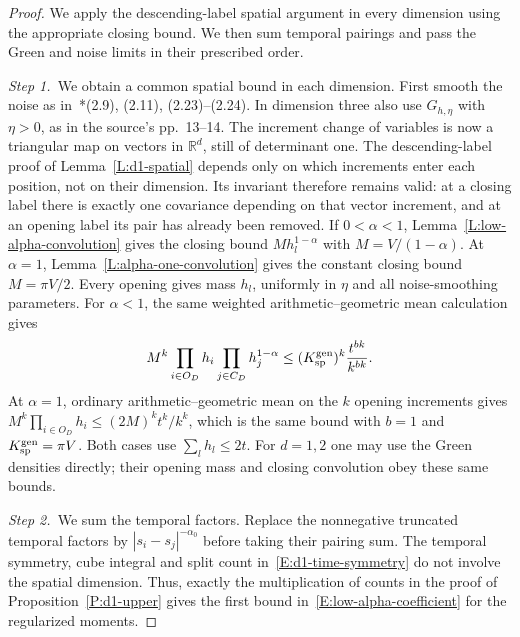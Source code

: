 \documentclass[12pt,oneside,openany]{book}
\numberwithin{equation}{section}
\theoremstyle{nogostyle}
\theoremstyle{definition}
\newcommand{\R}{\mathbb{R}}
\begin{document}
\begin{proof}
  We apply the descending-label spatial argument in every dimension using the
  appropriate closing bound. We then sum temporal pairings and pass the Green
  and noise limits in their prescribed order.


  \medskip
  \noindent\textit{Step 1.~}We obtain a common spatial bound in each
  dimension.
  First smooth the noise as in~\cite{chen:author2026:time-dependency}*{(2.9), (2.11), (2.23)--(2.24)}.
  In dimension three also use $G_{h,\eta}$ with $\eta > 0$, as in the
  source's pp.~13--14. The increment change of variables is now a
  triangular map on vectors in $\R^d$, still of determinant one.
  The descending-label proof of Lemma~\ref{L:d1-spatial} depends only
  on which increments enter each position, not on their dimension.
  Its invariant therefore remains valid: at a closing label there
  is exactly one covariance depending on that vector increment, and
  at an opening label its pair has already been removed.
  If $0 < \alpha < 1$, Lemma~\ref{L:low-alpha-convolution} gives the
  closing bound $Mh_l^{1-\alpha}$ with $M = V/(1-\alpha)$.
  At $\alpha = 1$, Lemma~\ref{L:alpha-one-convolution} gives the
  constant closing bound $M = \pi V/2$. Every opening gives mass
  $h_l$, uniformly in $\eta$ and all noise-smoothing parameters.
  For $\alpha < 1$, the same weighted arithmetic--geometric mean
  calculation gives
  \[
    M^k\prod_{i\in O_D}h_i\prod_{j\in C_D}h_j^{1-\alpha}
    \le (K_{\rm sp}^{\rm gen})^k\frac{t^{bk}}{k^{bk}}.
  \]
  At $\alpha = 1$, ordinary arithmetic--geometric mean on the $k$ opening
  increments gives $M^k\prod_{i\in O_D}h_i \le (2M)^kt^k/k^k$, which is the same
  bound with $b = 1$ and $K_{\rm sp}^{\rm gen} = \pi V$. Both cases use
  $\sum_lh_l \le 2t$. For $d = 1,2$ one may use the Green densities directly;
  their opening mass and closing convolution obey these same bounds.


  \medskip
  \noindent\textit{Step 2.~}We sum the temporal factors.
  Replace the nonnegative truncated temporal factors by $|s_i-s_j|^{-\alpha_0}$
  before taking their pairing sum. The temporal symmetry, cube integral and
  split count in~\eqref{E:d1-time-symmetry} do not involve the spatial
  dimension. Thus, exactly the multiplication of counts in the proof of
  Proposition~\ref{P:d1-upper} gives the first bound
  in~\eqref{E:low-alpha-coefficient} for the regularized moments.



\end{proof}
\end{document}
